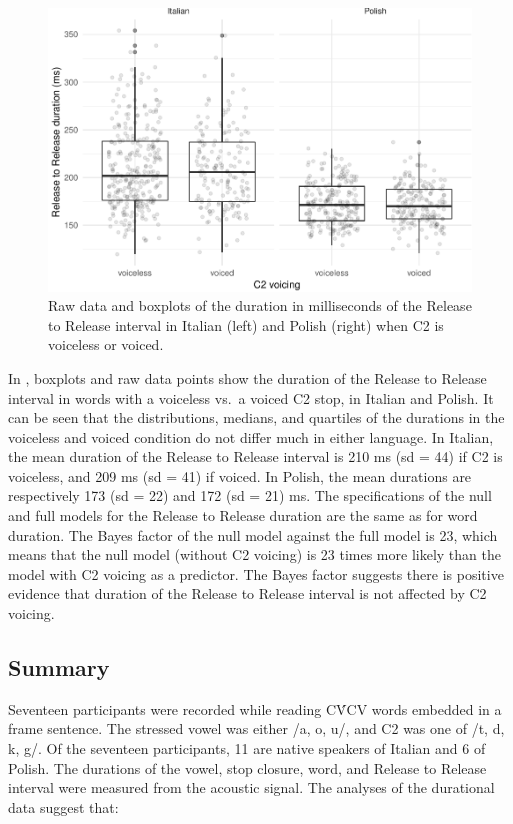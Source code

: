\documentclass[preprint]{JASAnew}
\begin{document}
\begin{figure}
\includegraphics[width=\linewidth]{2018-jasa_files/figure-latex/Figure5-1} \caption{Raw data and boxplots of the duration in milliseconds of the Release to Release interval in Italian (left) and Polish (right) when C2 is voiceless or voiced.}\label{f:Figure5}
\end{figure}

In , boxplots and raw data points show the duration of
the Release to Release interval in words with a voiceless vs.~a voiced
C2 stop, in Italian and Polish. It can be seen that the distributions,
medians, and quartiles of the durations in the voiceless and voiced
condition do not differ much in either language. In Italian, the mean
duration of the Release to Release interval is 210 ms (sd = 44) if C2 is
voiceless, and 209 ms (sd = 41) if voiced. In Polish, the mean durations
are respectively 173 (sd = 22) and 172 (sd = 21) ms. The specifications
of the null and full models for the Release to Release duration are the
same as for word duration. The Bayes factor of the null model against
the full model is 23, which means that the null model (without C2
voicing) is 23 times more likely than the model with C2 voicing as a
predictor. The Bayes factor suggests there is positive evidence that
duration of the Release to Release interval is not affected by C2
voicing.

\subsection{Summary}\label{summary}

Seventeen participants were recorded while reading CV́CV words embedded
in a frame sentence. The stressed vowel was either /a, o, u/, and C2 was
one of /t, d, k, g/. Of the seventeen participants, 11 are native
speakers of Italian and 6 of Polish. The durations of the vowel, stop
closure, word, and Release to Release interval were measured from the
acoustic signal. The analyses of the durational data suggest that:
\end{document}
